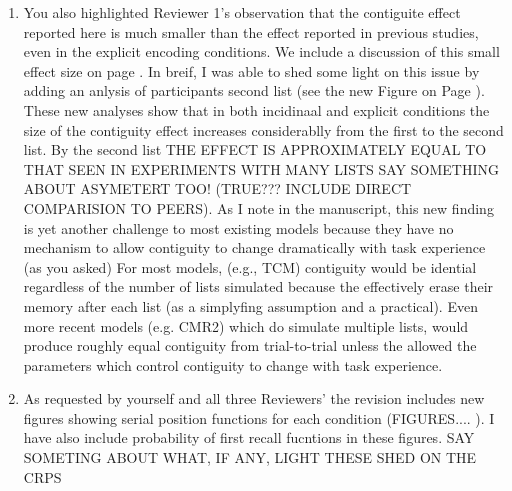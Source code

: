 \documentclass[12pt]{article}
\begin{document}
\begin{enumerate}
\item
	You also highlighted Reviewer 1's observation that the contiguite effect reported here is much smaller than the effect reported in previous studies, even in the explicit encoding conditions. We include a discussion of this small effect size on page \pageref{TODO-5}. In breif, I was able to shed some light on this issue by adding an anlysis of participants second list (see the new Figure on Page \pageref{TODO-6}). These new analyses show that in both incidinaal and explicit conditions the size of the contiguity effect increases considerablly from the first to the second list. By the second list THE EFFECT IS APPROXIMATELY EQUAL TO THAT SEEN IN EXPERIMENTS WITH MANY LISTS SAY SOMETHING ABOUT ASYMETERT TOO! (TRUE??? INCLUDE DIRECT COMPARISION TO PEERS). As I note in the manuscript, this new finding is yet another challenge to most existing models because they have no mechanism to allow contiguity to change dramatically with task experience (as you asked)
	For most models, (e.g., TCM) contiguity would be idential regardless of the number of lists simulated because the effectively erase their memory after each list (as a simplyfing assumption and a practical). Even more recent models (e.g. CMR2) which do simulate multiple lists, would produce roughly equal contiguity from trial-to-trial unless the allowed the parameters which control contiguity to change with task experience.

\item
	As requested by yourself and all three Reviewers' the revision includes new figures showing serial position functions for each condition (FIGURES.... \pageref{TODO-7}). I have also include probability of first recall fucntions in these figures. SAY SOMETING ABOUT WHAT, IF ANY, LIGHT THESE SHED ON THE CRPS


\end{enumerate}
\end{document}
